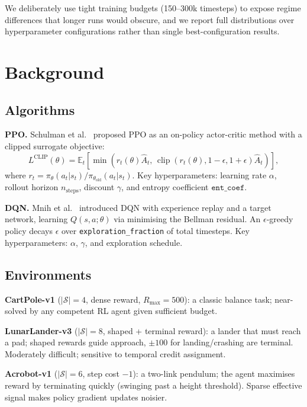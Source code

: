 \documentclass[10pt, a4paper, twocolumn]{article}
\begin{document}
We deliberately use tight training budgets (150–300k timesteps) to expose
regime differences that longer runs would obscure, and we report full
distributions over hyperparameter configurations rather than single
best-configuration results.

\section{Background}

\subsection{Algorithms}

\textbf{PPO.} Schulman et al.~\cite{schulman2017proximal} proposed PPO
as an on-policy actor-critic method with a clipped surrogate objective:
\[
L^{\text{CLIP}}(\theta) = \mathbb{E}_t\!\left[
  \min\!\left(r_t(\theta)\hat{A}_t,\,
  \operatorname{clip}\!\left(r_t(\theta),1{-}\epsilon,1{+}\epsilon\right)
  \hat{A}_t
  \right)
\right],
\]
where $r_t = \pi_\theta(a_t|s_t)/\pi_{\theta_\mathrm{old}}(a_t|s_t)$.
Key hyperparameters: learning rate $\alpha$, rollout horizon $n_\mathrm{steps}$,
discount $\gamma$, and entropy coefficient $\texttt{ent\_coef}$.

\textbf{DQN.} Mnih et al.~\cite{mnih2015human} introduced DQN with experience
replay and a target network, learning $Q(s,a;\theta)$ via minimising the Bellman
residual.  An $\epsilon$-greedy policy decays $\epsilon$ over
\texttt{exploration\_fraction} of total timesteps.
Key hyperparameters: $\alpha$, $\gamma$, and exploration schedule.

\subsection{Environments}

\textbf{CartPole-v1} ($|\mathcal{S}|=4$, dense reward, $R_\max=500$):
a classic balance task; near-solved by any competent RL agent given sufficient
budget.

\textbf{LunarLander-v3} ($|\mathcal{S}|=8$, shaped + terminal reward):
a lander that must reach a pad; shaped rewards guide approach, $\pm100$ for
landing/crashing are terminal.
Moderately difficult; sensitive to temporal credit assignment.

\textbf{Acrobot-v1} ($|\mathcal{S}|=6$, step cost $-1$):
a two-link pendulum; the agent maximises reward by terminating quickly (swinging
past a height threshold).
Sparse effective signal makes policy gradient updates noisier.
\end{document}
